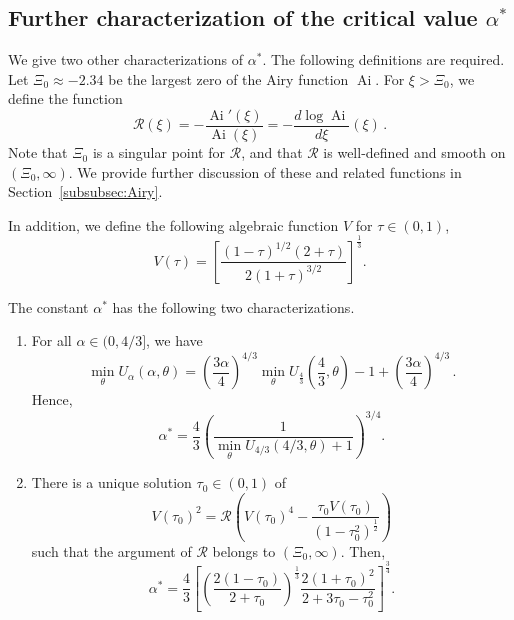\documentclass[AHL,Unicode,longabstracts]{cedram}
\DeclareMathOperator{\Ai}{Ai}
\newcommand{\mR}{\mathcal{R}}
\newcommand{\1}{\mathds{1}}
\newcommand*{\romanenumi}{\renewcommand*{\theenumi}{\roman{enumi}}}
\begin{document}
\subsection*{Further characterization of the critical value \texorpdfstring{$\alpha^*$}{alpha*}}



We give two other characterizations of $\alpha^*$. The following definitions are required. Let $\Xi_0\approx -2.34$ be the largest zero of the Airy function $\Ai$. For $\xi > \Xi_0$, we define the function
\begin{equation}\label{eq:riccati}
\mR(\xi) = - \frac{ \Ai'(\xi)}{ \Ai(\xi) } = - \frac{d \log \Ai}{d\xi} (\xi) \,.
\end{equation}
Note that $\Xi_0$ is a singular point for $\mR$, and that $\mR$ is well-defined and smooth on $(\Xi_0,\infty)$. We provide further discussion of these and related functions in Section~\ref{subsubsec:Airy}.


In addition, we define the following algebraic function $V$ for $\tau \in (0,1)$,
\begin{equation}\label{eq:V}
V(\tau) = \left[\frac{(1-\tau)^{1/2}(2+\tau)}{2(1+\tau)^{3/2}}\right]^\frac13.
\end{equation}


\begin{theo}\label{thm:alpha}
The constant $\alpha^*$ has the following two characterizations.
\begin{enumerate}\romanenumi
\item \label{theo1.3.1} For all $\alpha \in (0,4/3]$, we have
\begin{equation}\label{eq:U_scaling}
\min_\theta U_\alpha(\alpha,\theta) = \left(\frac{3\alpha}{4}\right)^{4/3} \min_\theta U_{\frac43}\left (\frac43, \theta\right) -1 + \left(\frac{3\alpha}{4}\right)^{4/3} \,.
\end{equation}
Hence,
\[
\alpha^* = \frac{4}{3} \left(\frac{1}{\min\limits_\theta U_{4/3}(4/3, \theta) + 1}\right)^{3/4}.
\]
\item \label{theo1.3.2} There is a unique solution $\tau_0\in (0,1)$ of
\begin{equation}\label{eq:V_condition}
V(\tau_0)^2 = \mR\left(V(\tau_0)^4 - \frac{\tau_0 V(\tau_0)}{\left (1-\tau_0^2\right)^\frac12}\right)
\end{equation}
such that the argument of $\mR$ belongs to $(\Xi_0,\infty)$. Then,
\begin{equation}\label{eq:alpha^* TH}
\alpha^* = \frac{4}{3} \left[\left(\frac{2(1-\tau_0)}{2+\tau_0}\right)^\frac13 \frac{2(1+\tau_0)^2}{2 + 3 \tau_0 - \tau_0^2} \right]^{\frac34}.
\end{equation}
\end{enumerate}
\end{theo}
\end{document}
